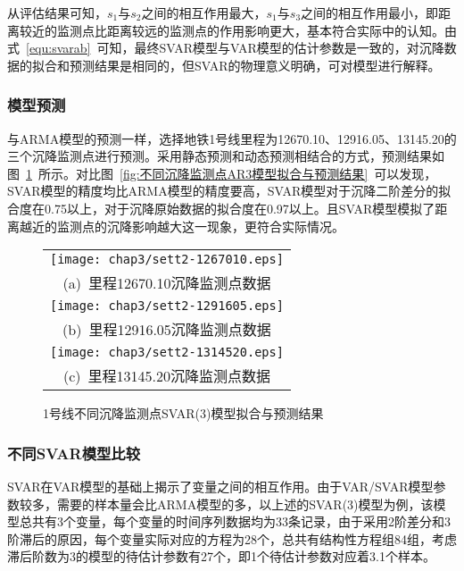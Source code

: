 从评估结果可知，$s_1$与$s_2$之间的相互作用最大，$s_1$与$s_3$之间的相互作用最小，即距离较近的监测点比距离较远的监测点的作用影响更大，基本符合实际中的认知。由式~\ref{equ:svarab}~可知，最终SVAR模型与VAR模型的估计参数是一致的，对沉降数据的拟合和预测结果是相同的，但SVAR的物理意义明确，可对模型进行解释。

\subsubsection{模型预测}

与ARMA模型的预测一样，选择地铁1号线里程为12670.10、12916.05、13145.20的三个沉降监测点进行预测。采用静态预测和动态预测相结合的方式，预测结果如图~\ref{fig:不同沉降监测点SVAR3模型拟合与预测结果}~所示。对比图~\ref{fig:不同沉降监测点AR3模型拟合与预测结果}~可以发现，SVAR模型的精度均比ARMA模型的精度要高，SVAR模型对于沉降二阶差分的拟合度在0.75以上，对于沉降原始数据的拟合度在0.97以上。且SVAR模型模拟了距离越近的监测点的沉降影响越大这一现象，更符合实际情况。

\begin{figure}[htbp] 
    \centering 
    \begin{tabular}{c} 
        \texttt{[image: chap3/sett2-1267010.eps]} \\ 
        (a)~里程12670.10沉降监测点数据 \\
        \texttt{[image: chap3/sett2-1291605.eps]} \\ 
        (b)~里程12916.05沉降监测点数据 \\
        \texttt{[image: chap3/sett2-1314520.eps]} \\ 
        (c)~里程13145.20沉降监测点数据 \\
    \end{tabular}
    \caption{1号线不同沉降监测点SVAR(3)模型拟合与预测结果} 
    \label{fig:不同沉降监测点SVAR3模型拟合与预测结果} 
\end{figure}

\subsubsection{不同SVAR模型比较}

SVAR在VAR模型的基础上揭示了变量之间的相互作用。由于VAR/SVAR模型参数较多，需要的样本量会比ARMA模型的多，以上述的SVAR(3)模型为例，该模型总共有3个变量，每个变量的时间序列数据均为33条记录，由于采用2阶差分和3阶滞后的原因，每个变量实际对应的方程为28个，总共有结构性方程组84组，考虑滞后阶数为3的模型的待估计参数有27个，即1个待估计参数对应着3.1个样本。

